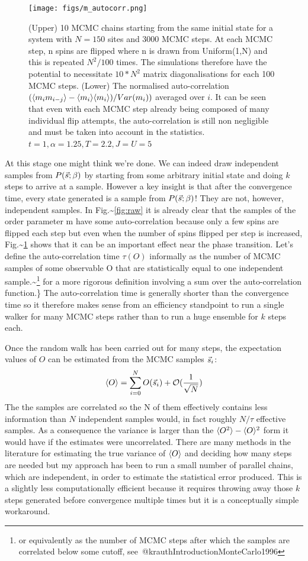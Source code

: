 \begin{figure}
  \centering
  \texttt{[image: figs/m\_autocorr.png]}
  \caption{(Upper) 10 MCMC chains starting from the same initial state for a system with $N = 150$ sites and 3000 MCMC steps. At each MCMC step, n spins are flipped where n is drawn from Uniform(1,N) and this is repeated $N^2/100$ times. The simulations therefore have the potential to necessitate $10*N^2$ matrix diagonalisations for each 100 MCMC steps. (Lower) The normalised auto-correlation $(\langle m_i m_{i-j} \rangle - \langle m_i \rangle\langle m_i \rangle) / Var(m_i))$ averaged over $i$. It can be seen that even with each MCMC step already being composed of many individual flip attempts, the auto-correlation is still non negligible and must be taken into account in the statistics. $t = 1, \alpha = 1.25, T = 2.2, J = U = 5 $ \label{fig:m_autocorr}}
\end{figure}

At this stage one might think we're done. We can indeed draw independent
samples from \(P(\vec{s}; \beta)\) by starting from some arbitrary initial
state and doing \(k\) steps to arrive at a sample. However a key insight
is that after the convergence time, every state generated is a sample
from \(P(\vec{s}; \beta)\)! They are not, however, independent samples. In
Fig.\textasciitilde{}\ref{fig:raw} it is already clear that the samples
of the order parameter m have some auto-correlation because only a few
spins are flipped each step but even when the number of spins flipped
per step is increased, Fig.\textasciitilde{}\ref{fig:m_autocorr} shows
that it can be an important effect near the phase transition. Let's
define the auto-correlation time \(\tau(O)\) informally as the number of
MCMC samples of some observable O that are statistically equal to one
independent
sample.\textasciitilde{}\footnote{or equivalently as the number of MCMC steps after which the samples are correlated below some cutoff, see~@krauthIntroductionMonteCarlo1996}
for a more rigorous definition involving a sum over the auto-correlation
function.\} The auto-correlation time is generally shorter than the
convergence time so it therefore makes sense from an efficiency
standpoint to run a single walker for many MCMC steps rather than to run
a huge ensemble for \(k\) steps each.

Once the random walk has been carried out for many steps, the
expectation values of \(O\) can be estimated from the MCMC samples
\(\vec{s}_i\): \[
    \langle O \rangle = \sum_{i = 0}^{N} O(\vec{s}_i) + \mathcal{O}(\frac{1}{\sqrt{N}})
\] The the samples are correlated so the N of them effectively contains
less information than \(N\) independent samples would, in fact roughly
\(N/\tau\) effective samples. As a consequence the variance is larger
than the \(\langle O^2 \rangle - \langle O \rangle^2\) form it would have if the estimates
were uncorrelated. There are many methods in the literature for
estimating the true variance of \(\langle O \rangle\) and deciding how many steps
are needed but my approach has been to run a small number of parallel
chains, which are independent, in order to estimate the statistical
error produced. This is a slightly less computationally efficient
because it requires throwing away those \(k\) steps generated before
convergence multiple times but it is a conceptually simple workaround.

